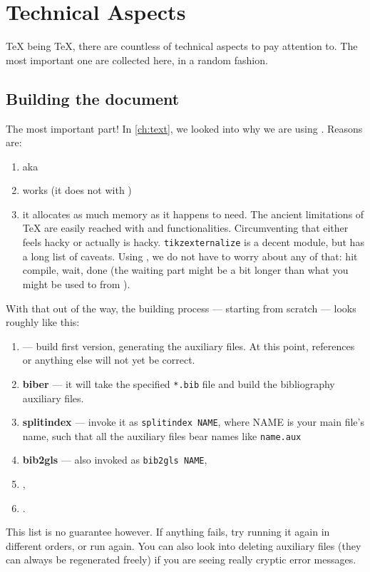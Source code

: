 \chapter{Technical Aspects}
\TeX{} being \TeX{}, there are countless of technical aspects to pay attention to.
The most important one are collected here, in a random fashion.

\section{Building the document}
The most important part!
In \cref{ch:text}, we looked into why we are using .
Reasons are:
\begin{enumerate}
	\item {} aka 
	\item {} works (it does not with )
	\item it allocates as much memory as it happens to need.
	The ancient limitations of \TeX{} are easily reached with  and  functionalities.
	Circumventing that either feels hacky or actually is hacky.
	\texttt{tikzexternalize} is a decent module, but has a long list of caveats.
	Using , we do not have to worry about any of that: hit compile, wait, done (the waiting part might be a bit longer than what you might be used to from ).
\end{enumerate}

With that out of the way, the building process --- starting from scratch --- looks roughly like this:
\begin{enumerate}
	\item \textbf{} --- build first version, generating the auxiliary files.
	At this point, references or anything else will not yet be correct.
	\item \textbf{biber} --- it will take the specified \texttt{*.bib} file and build the bibliography auxiliary files.
	\item \textbf{splitindex} --- invoke it as \texttt{splitindex NAME}, where NAME is your main file's name, such that all the auxiliary files bear names like \texttt{name.aux} 
	\item \textbf{bib2gls} --- also invoked as  \texttt{bib2gls NAME},
	\item \textbf{},
	\item \textbf{}.
\end{enumerate}
This list is no guarantee however.
If anything fails, try running it again in different orders, or run  again.
You can also look into deleting auxiliary files (they can always be regenerated freely) if you are seeing really cryptic error messages.

